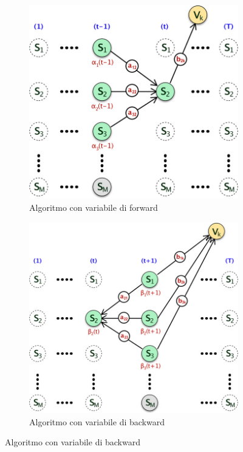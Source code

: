 \documentclass[a4paper,oneside,titlepage]{book}
\begin{document}
\begin{figure}[htp]
	\begin{subfigure}{0.49\textwidth}
	    \centering
		\includegraphics[width=\textwidth, height=\textheight, keepaspectratio]{hmm2.jpg}
		\caption{Algoritmo con variabile di forward}
	\end{subfigure}
	\hfill
	\begin{subfigure}{0.49\textwidth}
	    \centering
		\includegraphics[width=\textwidth, height=\textheight, keepaspectratio]{hmm3.jpg}
		\caption{Algoritmo con variabile di backward}
	\end{subfigure}
\end{figure}
\end{document}
